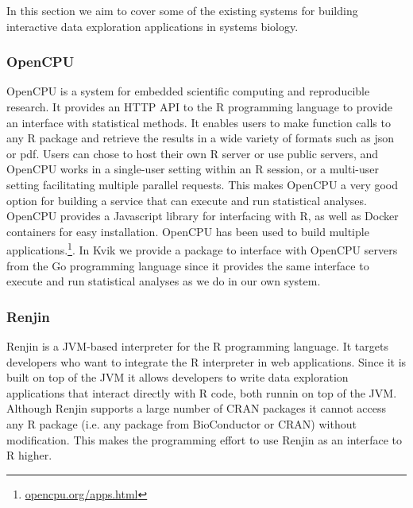 In this section we aim to cover some of the existing systems for building
interactive data exploration applications in systems biology. 



\subsubsection*{OpenCPU} 
OpenCPU is a system for embedded scientific computing and reproducible
research.\cite{opencpu} It provides an HTTP API to the R programming language to
provide an interface with statistical methods. It enables users to make function
calls to any R package and retrieve the results in a wide variety of formats
such as json or pdf. 
Users can chose to host their own R server or use public servers, and OpenCPU
works in a single-user setting within an R session, or a multi-user setting
facilitating multiple parallel requests. This makes OpenCPU a very good option
for building a service that can execute and run statistical analyses. 
OpenCPU provides a Javascript library for interfacing with R, as well as Docker
containers for easy installation. OpenCPU has been used to build multiple
applications.\footnote{\url{opencpu.org/apps.html}}.
In Kvik we provide a package
to interface with OpenCPU servers from the Go programming language since it
provides the same interface to execute and run statistical analyses as we do in
our own system. 


\subsubsection*{Renjin} 
Renjin is a JVM-based interpreter for the R programming language.\cite{renjin}
It targets developers who want to integrate the R interpreter in web
applications. Since it is built on top of the JVM it allows developers to write
data exploration applications that interact directly with R code, both runnin on
top of the JVM. Although Renjin supports a large number of CRAN packages it
cannot access any R package (i.e.  any package from BioConductor or CRAN)
without modification. This makes the programming effort to use Renjin as an
interface to R higher. 


